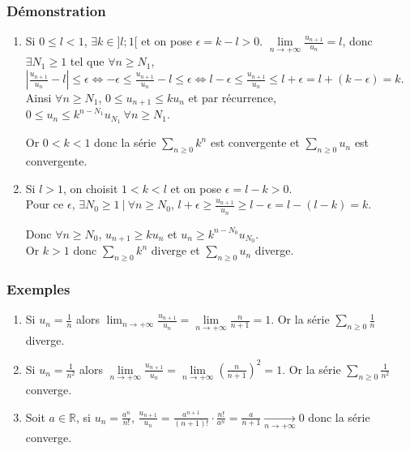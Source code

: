 \documentclass[a4paper,10pt]{book} %
\newcommand{\R}{\mathbb{R}}
\newcommand{\abs}[1]{\left|#1\right|}
\newcommand{\tq}{~|~}
\begin{document}
\subsubsection{Démonstration}
\begin{enumerate}
\item Si $0\leq l<1$, $\exists k\in ]l;1[$ et on pose $\epsilon=k-l>0$.
$\lim\limits_{n\rightarrow+\infty}\frac{u_{n+1}}{u_n}=l$, donc $\exists N_1\geq 1$ tel que $\forall n\geq N_1$, $\abs{\frac{u_{n+1}}{u_n}-l}\leq \epsilon\Leftrightarrow-\epsilon \leq \frac{u_{n+1}}{u_n}-l\leq \epsilon \Leftrightarrow l-\epsilon\leq \frac{u_{n+1}}{u_n}\leq l+\epsilon=l+(k-\epsilon)=k$.\\

Ainsi $\forall n\geq N_1$, $0\leq u_{n+1}\leq ku_n$ et par récurrence, $0\leq u_n\leq k^{n-N_1}u_{N_1}~\forall n\geq N_1$.

Or $0< k <1$ donc la série $\sum_{n\geq 0}k^n$ est convergente et $\sum_{n\geq 0}u_n$ est convergente.\smallskip

\item Si $l>1$, on choisit $1<k<l$ et on pose $\epsilon=l-k>0$.\\
Pour ce $\epsilon$, $\exists N_0\geq 1 \tq \forall n\geq N_0$, $l+\epsilon\geq \frac{u_{n+1}}{u_n}\geq l-\epsilon=l-(l-k)=k$.\smallskip

Donc $\forall n\geq N_0$, $u_{n+1}\geq ku_{n}$ et $u_n\geq k^{n-N_0}u_{N_0}$.\\
Or $k>1$ donc $\sum_{n\geq 0}k^n$ diverge et $\sum_{n\geq 0}u_n$ diverge.
\end{enumerate}

\subsubsection{Exemples}
\begin{enumerate}
\item Si $u_n=\frac{1}{n}$ alors $\lim_{n\rightarrow +\infty} \frac{u_{n+1}}{u_n}=\lim\limits_{n\rightarrow +\infty} \frac{n}{n+1}=1$.
Or la série $\sum_{n\geq 0}\frac{1}{n}$ diverge.

\item Si $u_n=\frac{1}{n^2}$ alors $\lim\limits_{n\rightarrow +\infty}\frac{u_{n+1}}{u_n}=\lim\limits_{n\rightarrow +\infty}(\frac{n}{n+1})^2=1$.
Or la série $\sum_{n\geq 0}\frac{1}{n^2}$ converge.

\item Soit $a\in\R$, si $u_n=\frac{a^n}{n!}$,
$\frac{u_{n+1}}{u_n}=\frac{a^{n+1}}{(n+1)!}\cdot\frac{n!}{a^n}=\frac{a}{n+1}\underset{n\rightarrow +\infty}{\rightarrow} 0$ donc la série converge.
\end{enumerate}
\end{document}
